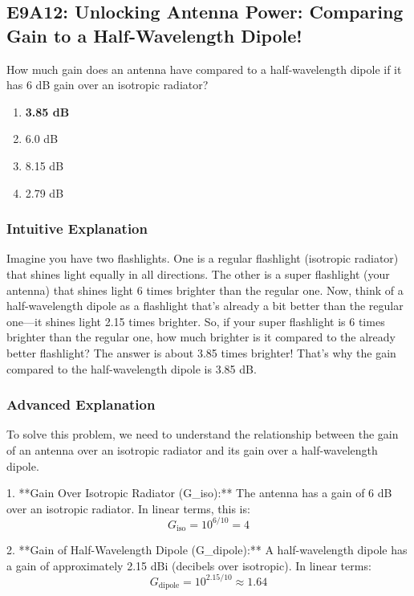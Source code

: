 \subsection{E9A12: Unlocking Antenna Power: Comparing Gain to a Half-Wavelength Dipole!}

\begin{tcolorbox}[colback=gray!10!white,colframe=black!75!black,title=\textbf{Question E9A12}]
How much gain does an antenna have compared to a half-wavelength dipole if it has 6 dB gain over an isotropic radiator?
\begin{enumerate}[label=\Alph*.]
    \item \textbf{3.85 dB}
    \item 6.0 dB
    \item 8.15 dB
    \item 2.79 dB
\end{enumerate}
\end{tcolorbox}

\subsubsection*{Intuitive Explanation}
Imagine you have two flashlights. One is a regular flashlight (isotropic radiator) that shines light equally in all directions. The other is a super flashlight (your antenna) that shines light 6 times brighter than the regular one. Now, think of a half-wavelength dipole as a flashlight that’s already a bit better than the regular one—it shines light 2.15 times brighter. So, if your super flashlight is 6 times brighter than the regular one, how much brighter is it compared to the already better flashlight? The answer is about 3.85 times brighter! That’s why the gain compared to the half-wavelength dipole is 3.85 dB.

\subsubsection*{Advanced Explanation}
To solve this problem, we need to understand the relationship between the gain of an antenna over an isotropic radiator and its gain over a half-wavelength dipole. 

1. **Gain Over Isotropic Radiator (G\_iso):** The antenna has a gain of 6 dB over an isotropic radiator. In linear terms, this is:
   \[
   G_{\text{iso}} = 10^{6/10} = 4
   \]

2. **Gain of Half-Wavelength Dipole (G\_dipole):** A half-wavelength dipole has a gain of approximately 2.15 dBi (decibels over isotropic). In linear terms:
   \[
   G_{\text{dipole}} = 10^{2.15/10} \approx 1.64
   \]

